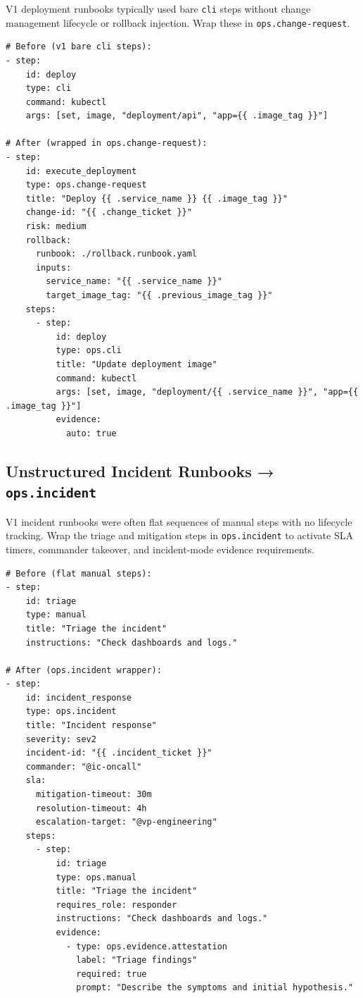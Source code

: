 V1 deployment runbooks typically used bare \texttt{cli} steps without change management
lifecycle or rollback injection. Wrap these in \texttt{ops.change-request}.

\begin{verbatim}
# Before (v1 bare cli steps):
- step:
    id: deploy
    type: cli
    command: kubectl
    args: [set, image, "deployment/api", "app={{ .image_tag }}"]

# After (wrapped in ops.change-request):
- step:
    id: execute_deployment
    type: ops.change-request
    title: "Deploy {{ .service_name }} {{ .image_tag }}"
    change-id: "{{ .change_ticket }}"
    risk: medium
    rollback:
      runbook: ./rollback.runbook.yaml
      inputs:
        service_name: "{{ .service_name }}"
        target_image_tag: "{{ .previous_image_tag }}"
    steps:
      - step:
          id: deploy
          type: ops.cli
          title: "Update deployment image"
          command: kubectl
          args: [set, image, "deployment/{{ .service_name }}", "app={{ .image_tag }}"]
          evidence:
            auto: true
\end{verbatim}

\subsection{Unstructured Incident Runbooks → \texttt{ops.incident}}

V1 incident runbooks were often flat sequences of manual steps with no lifecycle tracking.
Wrap the triage and mitigation steps in \texttt{ops.incident} to activate SLA timers,
commander takeover, and incident-mode evidence requirements.

\begin{verbatim}
# Before (flat manual steps):
- step:
    id: triage
    type: manual
    title: "Triage the incident"
    instructions: "Check dashboards and logs."

# After (ops.incident wrapper):
- step:
    id: incident_response
    type: ops.incident
    title: "Incident response"
    severity: sev2
    incident-id: "{{ .incident_ticket }}"
    commander: "@ic-oncall"
    sla:
      mitigation-timeout: 30m
      resolution-timeout: 4h
      escalation-target: "@vp-engineering"
    steps:
      - step:
          id: triage
          type: ops.manual
          title: "Triage the incident"
          requires_role: responder
          instructions: "Check dashboards and logs."
          evidence:
            - type: ops.evidence.attestation
              label: "Triage findings"
              required: true
              prompt: "Describe the symptoms and initial hypothesis."
\end{verbatim}

